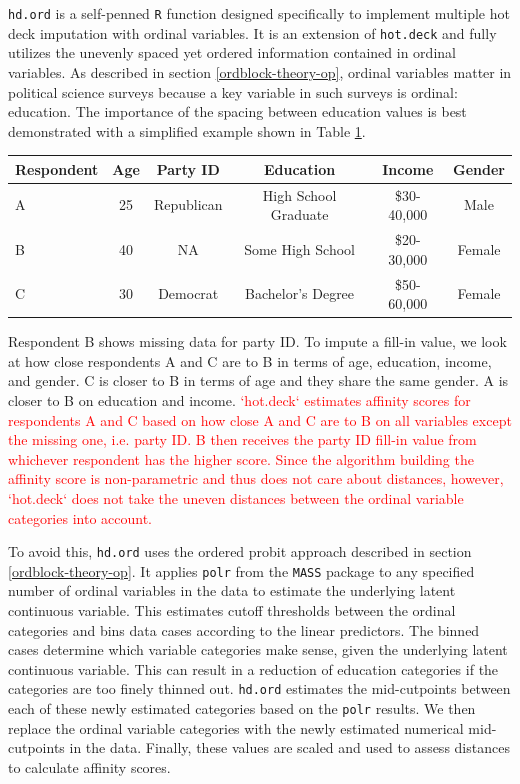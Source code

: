 \documentclass[12pt,econ]{sources/authesis}
\makeatletter
\def\caption{\refstepcounter\@captype \@dblarg{\@caption\@captype}}
\makeatother
\begin{document}
\texttt{hd.ord} is a self-penned \texttt{R} function designed specifically to implement multiple hot deck imputation with ordinal variables. It is an extension of \texttt{hot.deck} and fully utilizes the unevenly spaced yet ordered information contained in ordinal variables. As described in section \ref{ordblock-theory-op}, ordinal variables matter in political science surveys because a key variable in such surveys is ordinal: education. The importance of the spacing between education values is best demonstrated with a simplified example shown in Table \ref{ordmiss-ordspace}.
\begin{table}[!htbp] 
  \centering
  \caption{Illustrative Data}
  \label{ordmiss-ordspace}
  \begin{tabular}{lccccc}
  \bottomrule 
  \midrule
  Respondent & Age & Party ID & Education & Income & Gender\\
  \hline
  A & 25 & Republican & High School Graduate & \$30-40,000 & Male \\
  B & 40 & NA & Some High School &  \$20-30,000 & Female\\
  C & 30 & Democrat & Bachelor's Degree &  \$50-60,000 & Female\\
  \bottomrule 
  \end{tabular}
\end{table}
Respondent B shows missing data for party ID. To impute a fill-in value, we look at how close respondents A and C are to B in terms of age, education, income, and gender. C is closer to B in terms of age and they share the same gender. A is closer to B on education and income. \textcolor{red}{`hot.deck` estimates affinity scores for respondents A and C based on how close A and C are to B on all variables except the missing one, i.e. party ID. B then receives the party ID fill-in value from whichever respondent has the higher score. Since the algorithm building the affinity score is non-parametric and thus does not care about distances, however, `hot.deck` does not take the uneven distances between the ordinal variable categories into account.}

To avoid this, \texttt{hd.ord} uses the ordered probit approach described in section \ref{ordblock-theory-op}. It applies \texttt{polr} from the \texttt{MASS} package to any specified number of ordinal variables in the data to estimate the underlying latent continuous variable. This estimates cutoff thresholds between the ordinal categories and bins data cases according to the linear predictors. The binned cases determine which variable categories make sense, given the underlying latent continuous variable. This can result in a reduction of education categories if the categories are too finely thinned out. \texttt{hd.ord} estimates the mid-cutpoints between each of these newly estimated categories based on the \texttt{polr} results. We then replace the ordinal variable categories with the newly estimated numerical mid-cutpoints in the data. Finally, these values are scaled and used to assess distances to calculate affinity scores.
\end{document}
